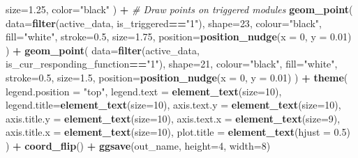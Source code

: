 \documentclass[
]{book}
\newenvironment{Shaded}{\begin{snugshade}}{\end{snugshade}}
\newcommand{\CommentTok}[1]{\textcolor[rgb]{0.56,0.35,0.01}{\textit{#1}}}
\newcommand{\DataTypeTok}[1]{\textcolor[rgb]{0.13,0.29,0.53}{#1}}
\newcommand{\DecValTok}[1]{\textcolor[rgb]{0.00,0.00,0.81}{#1}}
\newcommand{\FloatTok}[1]{\textcolor[rgb]{0.00,0.00,0.81}{#1}}
\newcommand{\KeywordTok}[1]{\textcolor[rgb]{0.13,0.29,0.53}{\textbf{#1}}}
\newcommand{\NormalTok}[1]{#1}
\newcommand{\OperatorTok}[1]{\textcolor[rgb]{0.81,0.36,0.00}{\textbf{#1}}}
\newcommand{\StringTok}[1]{\textcolor[rgb]{0.31,0.60,0.02}{#1}}
\begin{document}
\begin{Shaded}
\begin{Highlighting}[]
    \DataTypeTok{size=}\FloatTok{1.25}\NormalTok{,}
    \DataTypeTok{color=}\StringTok{"black"}
\NormalTok{  ) }\OperatorTok{+}
\StringTok{  }\CommentTok{\# Draw points on triggered modules}
\StringTok{  }\KeywordTok{geom\_point}\NormalTok{(}
    \DataTypeTok{data=}\KeywordTok{filter}\NormalTok{(active\_data, is\_triggered}\OperatorTok{==}\StringTok{"1"}\NormalTok{),}
    \DataTypeTok{shape=}\DecValTok{23}\NormalTok{,}
    \DataTypeTok{colour=}\StringTok{"black"}\NormalTok{,}
    \DataTypeTok{fill=}\StringTok{"white"}\NormalTok{,}
    \DataTypeTok{stroke=}\FloatTok{0.5}\NormalTok{,}
    \DataTypeTok{size=}\FloatTok{1.75}\NormalTok{,}
    \DataTypeTok{position=}\KeywordTok{position\_nudge}\NormalTok{(}\DataTypeTok{x =} \DecValTok{0}\NormalTok{, }\DataTypeTok{y =} \FloatTok{0.01}\NormalTok{)}
\NormalTok{  ) }\OperatorTok{+}
\StringTok{  }\KeywordTok{geom\_point}\NormalTok{(}
    \DataTypeTok{data=}\KeywordTok{filter}\NormalTok{(active\_data, is\_cur\_responding\_function}\OperatorTok{==}\StringTok{"1"}\NormalTok{),}
    \DataTypeTok{shape=}\DecValTok{21}\NormalTok{,}
    \DataTypeTok{colour=}\StringTok{"black"}\NormalTok{,}
    \DataTypeTok{fill=}\StringTok{"white"}\NormalTok{,}
    \DataTypeTok{stroke=}\FloatTok{0.5}\NormalTok{,}
    \DataTypeTok{size=}\FloatTok{1.5}\NormalTok{,}
    \DataTypeTok{position=}\KeywordTok{position\_nudge}\NormalTok{(}\DataTypeTok{x =} \DecValTok{0}\NormalTok{, }\DataTypeTok{y =} \FloatTok{0.01}\NormalTok{)}
\NormalTok{  ) }\OperatorTok{+}
\StringTok{  }\KeywordTok{theme}\NormalTok{(}
    \DataTypeTok{legend.position =} \StringTok{"top"}\NormalTok{,}
    \DataTypeTok{legend.text =} \KeywordTok{element\_text}\NormalTok{(}\DataTypeTok{size=}\DecValTok{10}\NormalTok{),}
    \DataTypeTok{legend.title=}\KeywordTok{element\_text}\NormalTok{(}\DataTypeTok{size=}\DecValTok{10}\NormalTok{),}
    \DataTypeTok{axis.text.y =} \KeywordTok{element\_text}\NormalTok{(}\DataTypeTok{size=}\DecValTok{10}\NormalTok{),}
    \DataTypeTok{axis.title.y =} \KeywordTok{element\_text}\NormalTok{(}\DataTypeTok{size=}\DecValTok{10}\NormalTok{),}
    \DataTypeTok{axis.text.x =} \KeywordTok{element\_text}\NormalTok{(}\DataTypeTok{size=}\DecValTok{9}\NormalTok{),}
    \DataTypeTok{axis.title.x =} \KeywordTok{element\_text}\NormalTok{(}\DataTypeTok{size=}\DecValTok{10}\NormalTok{),}
    \DataTypeTok{plot.title =} \KeywordTok{element\_text}\NormalTok{(}\DataTypeTok{hjust =} \FloatTok{0.5}\NormalTok{)}
\NormalTok{  ) }\OperatorTok{+}
\StringTok{  }\KeywordTok{coord\_flip}\NormalTok{() }\OperatorTok{+}
\StringTok{  }\KeywordTok{ggsave}\NormalTok{(out\_name, }\DataTypeTok{height=}\DecValTok{4}\NormalTok{, }\DataTypeTok{width=}\DecValTok{8}\NormalTok{)}
\end{Highlighting}
\end{Shaded}
\end{document}
